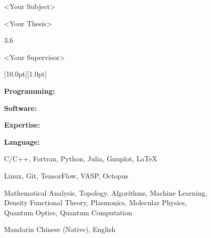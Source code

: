 \documentclass[12pt,a4paper,utf8]{report}
\begin{document}
    \begin{minipage}[t]{11cm}
        \textless Your Subject\textgreater \par
        \textless Your Thesis\textgreater \par
        3.6 \par
        \textless Your Supervisor\textgreater \par
    \end{minipage}\par
\vspace{0.4cm}

\begin{minipage}[t]{16cm}
    \colorbox{subtitlecolor}{\raisebox{0pt}[10.0pt][1.0pt]{
        \textcolor{white}{\textsf{}}}}
\end{minipage}\par
\vspace{0.2cm}
    \begin{minipage}[t]{4cm}
        \qquad \textbf{Programming:}\par
        \qquad \textbf{Software:}\par
        \qquad \textbf{Expertise:}\par
        \qquad \par
        \qquad \par
        \qquad \textbf{Language:}\par
    \end{minipage}
    \begin{minipage}[t]{14cm}
        C/C++, Fortran, Python, Julia, Gnuplot, \LaTeX \par
        Linux, Git, TensorFlow, VASP, Octopus\par
        Mathematical Analysis, Topology, Algorithms, Machine Learning, \\
        Density Functional Theory, Plasmonics, Molecular Physics, \\
        Quantum Optics, Quantum Computation \par
        Mandarin Chinese (Native), English \par
    \end{minipage}\par
\vspace{0.4cm}
\end{document}
